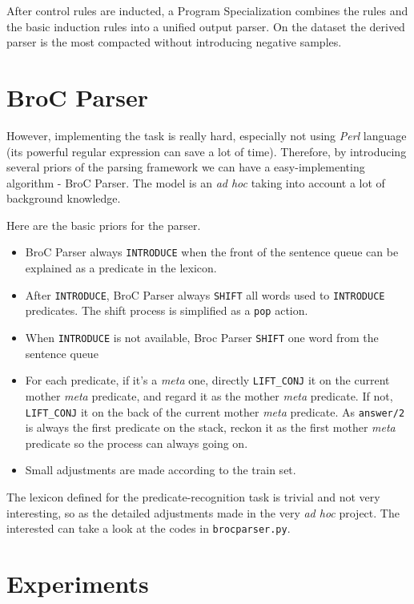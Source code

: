 \documentclass[11pt,a4paper]{article}
\begin{document}
After control rules are inducted, a Program Specialization combines the rules and the basic induction rules into a unified output parser. On the dataset the derived parser is the most compacted without introducing negative samples.

\section{BroC Parser}

However, implementing the task is really hard, especially not using \textit{Perl} language (its powerful regular expression can save a lot of time). Therefore, by introducing several priors of the parsing framework we can have a easy-implementing algorithm - BroC Parser. The model is an \textit{ad hoc} taking into account a lot of background knowledge.

Here are the basic priors for the parser.
\begin{itemize}
  \item BroC Parser always \texttt{INTRODUCE} when the front of the sentence queue can be explained as a predicate in the lexicon.
  \item After \texttt{INTRODUCE}, BroC Parser always \texttt{SHIFT} all words used to \texttt{INTRODUCE} predicates. The shift process is simplified as a \texttt{pop} action.
  \item When \texttt{INTRODUCE} is not available, Broc Parser \texttt{SHIFT} one word from the sentence queue
  \item For each predicate, if it's a \textit{meta} one, directly \texttt{LIFT\_CONJ} it on the current mother \textit{meta} predicate, and regard it as the mother \textit{meta} predicate. If not, \texttt{LIFT\_CONJ} it on the back of the current mother \textit{meta} predicate. As \texttt{answer/2} is always the first predicate on the stack, reckon it as the first mother \textit{meta} predicate so the process can always going on.
  \item Small adjustments are made according to the train set.
\end{itemize}

The lexicon defined for the predicate-recognition task is trivial and not very interesting, so as the detailed adjustments made in the very \textit{ad hoc} project. The interested can take a look at the codes in \texttt{brocparser.py}.

\section{Experiments}
\end{document}
